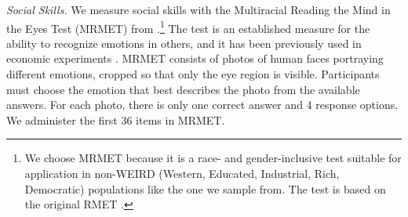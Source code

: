 \documentclass[11pt,a4paper,oneside]{article}
\begin{document}
\textit{Social Skills.} We measure social skills with the Multiracial Reading the Mind in the Eyes Test (MRMET) from \citet{kim_multiracial_2022}.\footnote{We choose MRMET because it is a race- and gender-inclusive test suitable for application in non-WEIRD (Western, Educated, Industrial, Rich, Democratic) populations like the one we sample from. The test is based on the original RMET \citep{baron-cohen_reading_2001}.} The test is an established measure for the ability to recognize emotions in others, and it has been previously used in economic experiments \citep{van_leeuwen_predictably_2018, weidmann_team_2021}. MRMET consists of photos of human faces portraying different emotions, cropped so that only the eye region is visible. Participants must choose the emotion that best describes the photo from the available answers. For each photo, there is only one correct answer and 4 response options. We administer the first 36 items in MRMET. 
\end{document}
